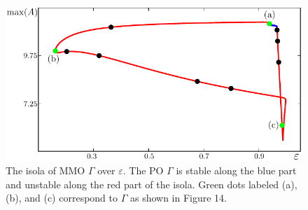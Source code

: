 \documentclass{ws-ijbc}
\begin{document}
\begin{figure}[H]
\centering
\includegraphics[]{./figures/MKMO_18.pdf}
\caption{The isola of MMO $\Gamma$ over $\varepsilon$.  The PO $\Gamma$ is stable along the blue part and unstable along the red part of the isola.  Green dots labeled (a), (b), and (c) correspond to $\Gamma$ as shown in Figure 14.}
\label{figure_18}
\end{figure}
\end{document}
